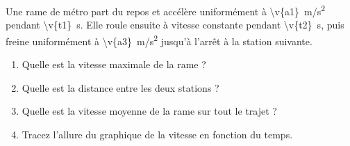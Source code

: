 Une rame de métro part du repos et accélère uniformément à \qty{\v{a1}}{m/s^2} pendant \qty{\v{t1}}{s}. Elle roule ensuite à vitesse constante pendant \qty{\v{t2}}{s}, puis freine uniformément à \qty{\v{a3}}{m/s^2} jusqu'à l'arrêt à la station suivante.

\begin{enumerate}[label=\alph*)]
    \item Quelle est la vitesse maximale de la rame ?
    \item Quelle est la distance entre les deux stations ?
    \item Quelle est la vitesse moyenne de la rame sur tout le trajet ?
    \item Tracez l'allure du graphique de la vitesse en fonction du temps.
\end{enumerate}
